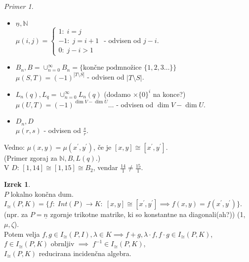 \documentclass[a4paper, 12pt]{book}
\theoremstyle{definition}
\newtheorem{theorem}[counter]{Izrek}
\theoremstyle{remark}
\newtheorem*{ex}{Primer}
\newcommand{\N}{\mathbb{N}}
\begin{document}
\begin{ex} \text{} \\
  \begin{itemize}
    \item $\underline{n}, \N$ \\
      $\mu(i, j) = \begin{cases}1: \; i=j \\ -1: \; j = i+1 \\ 0: \; j-i > 1\end{cases}$ - odvisen od $j-i$.
    \item $B_n, B = \cup_{n=0}^{\infty} B_n = \{\text{končne podmnožice } \{1, 2, 3 \dots\}\}$ \\
      $\mu(S, T) = (-1)^{|T \setminus S|}$ - odvisen od $|T \setminus S|$.
    \item $L_n(q), L_q = \cup_{n=0}^{\infty} L_n(q)$ (dodamo $\times \{0\}^i$ na konce?) \\
      $\mu(U, T) = (-1)^{\dim V - \dim U} \dots$ - odvisen od $\dim V - \dim U$.
    \item $D_n, D$ \\
      $\mu(r, s)$ - odvisen od $\frac{s}{r}$.
  \end{itemize}
\end{ex}
Vedno: $\mu(x, y) = \mu(x^{'}, y^{'})$, če je $[x, y] \cong [x^{'}, y^{'}]$. \\
(Primer zgoraj za $\N, B, L(q)$.) \\
V $D$: $[1, 14] \cong [1, 15] \cong B_2$, vendar $\frac{14}{1} \neq \frac{15}{1}$.
\begin{theorem} \text{} \\
  $P$ lokalno končna dum. \\
  $I_{\cong}(P, K) = \{f: \; Int(P) \to K: \; [x,y] \cong [x^{'}, y^{'}] \implies f(x,y) = f(x^{'},y^{'})\}$. \\
  (npr. za $P = \underline{n}$ zgornje trikotne matrike, ki so konstantne na diagonali(ah?)) (1, $\mu, \zeta$). \\
  Potem velja $f, g \in I_{\cong}(P, I), \lambda \in K \implies
  f + g, \lambda \cdot f, f \cdot g \in I_{\cong}(P, K)$, \\
  $f \in I_{\cong}(P, K)$ obrnljiv $\implies \; f^{-1} \in I_{\cong}(P, K)$, \\
  $I_{\cong}(P, K)$ reducirana incidenčna algebra.
\end{theorem}
\end{document}

